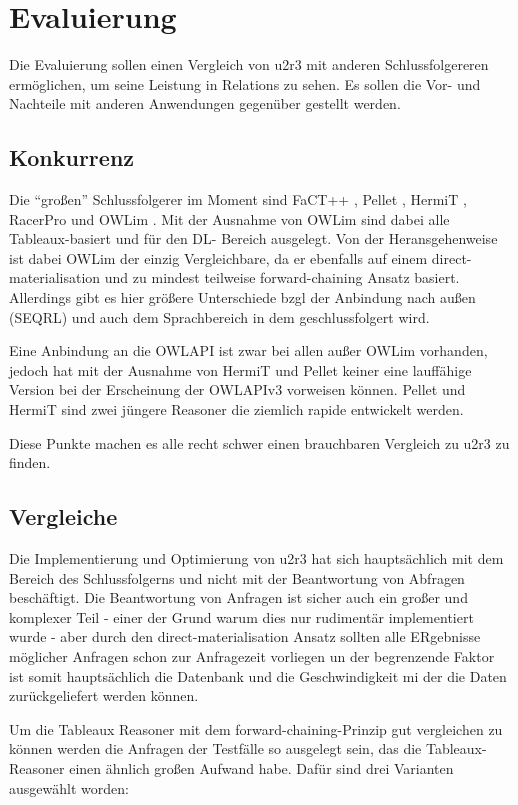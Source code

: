 \chapter{Evaluierung}
Die Evaluierung sollen einen Vergleich von u2r3 mit anderen Schlussfolgereren ermöglichen, um seine Leistung in Relations zu sehen. Es sollen die Vor- und Nachteile mit anderen Anwendungen gegenüber gestellt werden.

\section{Konkurrenz}
Die ``großen'' Schlussfolgerer im Moment sind FaCT++ \cite{Factpp}, Pellet \cite{Pellet}, HermiT \cite{Hermit}, RacerPro \cite{RacerPro} und OWLim \cite{OWLim}. Mit der Ausnahme von OWLim sind dabei alle Tableaux-basiert und für den DL- Bereich ausgelegt. Von der Heransgehenweise ist dabei OWLim der einzig Vergleichbare, da er ebenfalls auf einem direct-materialisation und zu mindest teilweise forward-chaining Ansatz basiert. Allerdings gibt es hier größere Unterschiede bzgl der Anbindung nach außen (SEQRL) und auch dem Sprachbereich in dem geschlussfolgert wird.

Eine Anbindung an die OWLAPI ist zwar bei allen außer OWLim vorhanden, jedoch hat mit der Ausnahme von HermiT und Pellet keiner eine lauffähige Version bei der Erscheinung der OWLAPIv3 vorweisen können. Pellet und HermiT sind zwei jüngere Reasoner die ziemlich rapide entwickelt werden.

Diese Punkte machen es alle recht schwer einen brauchbaren Vergleich zu u2r3 zu finden.

\section{Vergleiche}
Die Implementierung und Optimierung von u2r3 hat sich hauptsächlich mit dem Bereich des Schlussfolgerns und nicht mit der Beantwortung von Abfragen beschäftigt. Die Beantwortung von Anfragen ist sicher auch ein großer und komplexer Teil - einer der Grund warum dies nur rudimentär implementiert wurde - aber durch den direct-materialisation Ansatz sollten alle ERgebnisse möglicher Anfragen schon zur Anfragezeit vorliegen un der begrenzende Faktor ist somit hauptsächlich die Datenbank und die Geschwindigkeit mi der die Daten zurückgeliefert werden können.

Um die Tableaux Reasoner mit dem forward-chaining-Prinzip gut vergleichen zu können werden die Anfragen der Testfälle so ausgelegt sein, das die Tableaux-Reasoner einen ähnlich großen Aufwand habe. Dafür sind drei Varianten ausgewählt worden:

